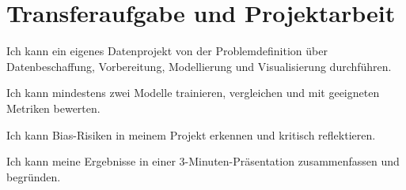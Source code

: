 \section{Transferaufgabe und Projektarbeit}
\begin{todolist}
    \item Ich kann ein eigenes Datenprojekt von der Problemdefinition über Datenbeschaffung, Vorbereitung, Modellierung und Visualisierung durchführen.
    \item Ich kann mindestens zwei Modelle trainieren, vergleichen und mit geeigneten Metriken bewerten.
    \item Ich kann Bias-Risiken in meinem Projekt erkennen und kritisch reflektieren.
    \item Ich kann meine Ergebnisse in einer 3-Minuten-Präsentation zusammenfassen und begründen.
\end{todolist}